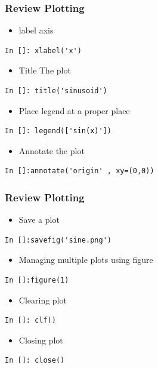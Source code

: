 \documentclass[14pt,compress]{beamer}
\newcounter{time}
\newcommand{\inctime}[1]{\addtocounter{time}{#1}{\tiny \thetime\ m}}
\begin{document}
\begin{frame}[fragile]
\frametitle{Review Plotting }
\vspace{-0.1in}
\begin{itemize}
\item   label axis
\end{itemize}
\begin{lstlisting}
In []: xlabel('x')
\end{lstlisting}
\begin{itemize}
\item Title The plot  
\end{itemize}
\begin{lstlisting}
In []: title('sinusoid')
\end{lstlisting}
\begin{itemize}
\item Place legend at a proper place
\end{itemize}
\begin{lstlisting}
In []: legend(['sin(x)'])
\end{lstlisting}
\begin{itemize}
\item Annotate the plot
\end{itemize}
\begin{lstlisting}
In []:annotate('origin' , xy=(0,0)) 
\end{lstlisting}
\end{frame}




\begin{frame}[fragile]
\frametitle{Review Plotting }
\vspace{-0.15in}
\begin{itemize}
\item Save a plot
\end{itemize}
\begin{lstlisting}
In []:savefig('sine.png')
\end{lstlisting}
\begin{itemize}
\item Managing multiple plots using figure
\end{itemize}
\begin{lstlisting}
In []:figure(1)
\end{lstlisting}
\begin{itemize}
\item Clearing plot 
\end{itemize}
\begin{lstlisting}
In []: clf()
\end{lstlisting}
\begin{itemize}
\item Closing plot 
\end{itemize}
\begin{lstlisting}
In []: close()
\end{lstlisting}

\end{frame}
\end{document}
